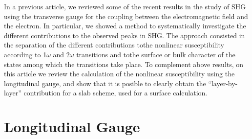 \documentclass[floatfix,prb,aps,superscriptaddress,11pt,preprint]{revtex4}
\begin{document}
In a previous article,\cite{mendoza_epioptics_2001} we reviewed some
of the recent results in the study of SHG using the transverse gauge
for the coupling between the electromagnetic field and the
electron. In particular, we 
showed a method to systematically investigate the different
contributions to the observed peaks in
SHG.\cite{arzate_microscopic_2001} The approach consisted in the
separation of the different contributions tothe nonlinear
susceptibility according to 1$\omega$ and 2$\omega$ transitions and
tothe  surface or bulk character of the states among which the
transitions take place. To complement above results, on this article
we review the calculation of the nonlinear susceptibility using the
longitudinal gauge, and show that it is posible to clearly obtain the
``layer-by-layer'' contribution for a slab scheme, used for a surface
calculation.

\section{Longitudinal Gauge}\label{longi}
\end{document}
